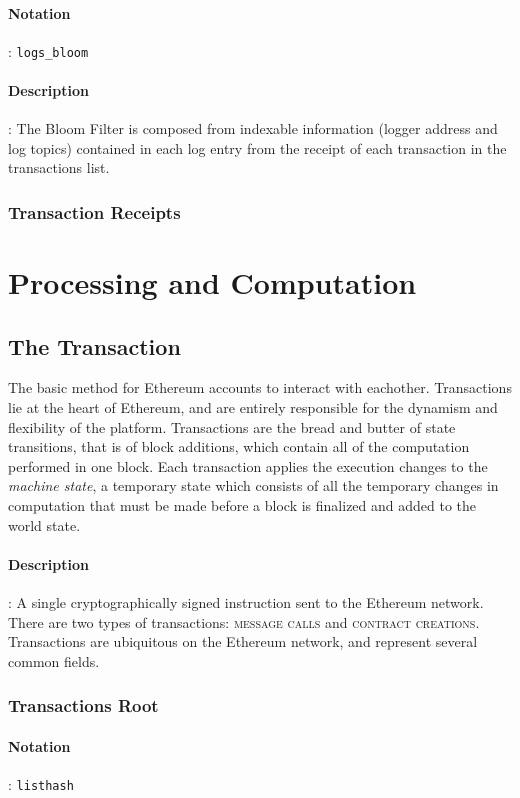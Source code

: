 \documentclass[10pt,a4paper,leqno,bibliography=totoc]{scrartcl}
\newenvironment{alphafootnotes}
{\par\edef\savedfootnotenumber{\number\value{footnote}}
\renewcommand{\thefootnote}{\alph{footnote}}
\setcounter{footnote}{0}}
{\par\setcounter{footnote}{\savedfootnotenumber}}
\begin{document}
\begin{alphafootnotes}
\begin{multicols*}{2}
				\paragraph{Notation}: \texttt{logs\_bloom}
				\paragraph{Description}: The Bloom Filter is composed from indexable information (logger address and log topics) contained in each log entry from the receipt of each transaction in the transactions list. 

		\subsubsection{Transaction Receipts}


	\section{Processing and Computation}
	
		\subsection{The Transaction}
	
			The basic method for Ethereum accounts to interact with eachother. Transactions lie at the heart of Ethereum, and are entirely responsible for the dynamism and flexibility of the platform. Transactions are the bread and butter of state transitions, that is of block additions, which contain all of the computation performed in one block. Each transaction applies the execution changes to the \textit{machine state}, a temporary state which consists of all the temporary changes in computation that must be made before a block is finalized and added to the world state.
	
				\paragraph{Description}: A single cryptographically signed instruction sent to the Ethereum network. There are two types of transactions: \textsc{message calls} and \textsc{contract creations}. Transactions are ubiquitous on the Ethereum network, and represent several common fields. 
			\subsubsection{Transactions Root}
			\paragraph{Notation}: \texttt{listhash}

\end{multicols*}
\end{alphafootnotes}
\end{document}
